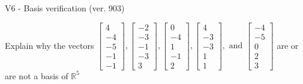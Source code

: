 \begin{exercise}
  \begin{exerciseTitle}V6 - Basis verification (ver. 903)\end{exerciseTitle}
  \begin{exerciseStatement}
    Explain why the vectors \(\left[\begin{array}{r}
4 \\
-4 \\
-5 \\
-1 \\
-1
\end{array}\right] , \left[\begin{array}{r}
-2 \\
-3 \\
-1 \\
-3 \\
3
\end{array}\right] , \left[\begin{array}{r}
0 \\
-4 \\
1 \\
-1 \\
2
\end{array}\right] , \left[\begin{array}{r}
4 \\
-3 \\
-3 \\
1 \\
1
\end{array}\right] , \text{ and } \left[\begin{array}{r}
-4 \\
-5 \\
0 \\
2 \\
3
\end{array}\right]\) are or are not a basis of \(\mathbb{R}^5\)	



\end{exerciseStatement}
\end{exercise}
